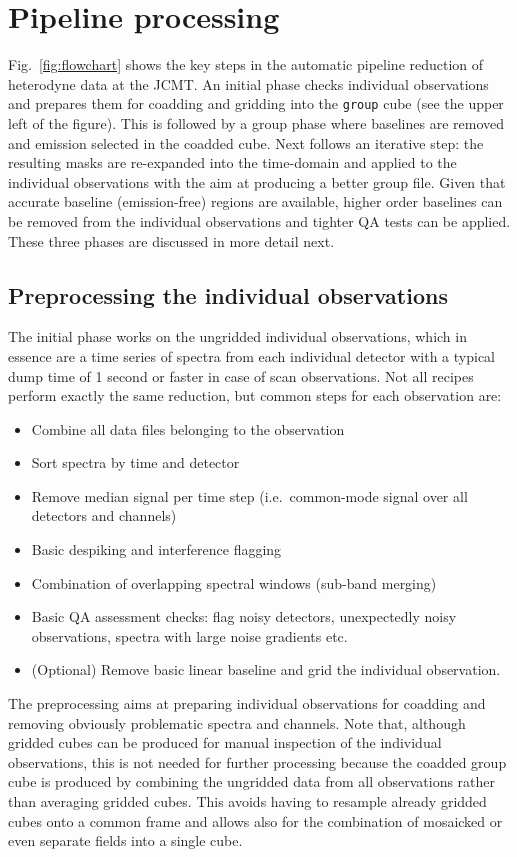 \documentclass[final,authoryear,5p,times,twocolumn]{elsarticle}
\begin{document}
\section{Pipeline processing}

Fig.~\ref{fig:flowchart} shows the key steps in the automatic
pipeline reduction of heterodyne data at the JCMT. An initial phase
checks individual observations and prepares them for coadding and
gridding into the \texttt{group} cube (see the upper left of the figure).
This is followed by a group
phase where baselines are removed and emission selected in the coadded
cube.  Next follows an iterative step: the resulting masks are
re-expanded into the time-domain and applied to the individual
observations with the aim at producing a better group file. Given that
accurate baseline (emission-free) regions are available, higher
order baselines can be removed from the individual observations and
tighter QA tests can be applied. These three phases are discussed in
more detail next.

\subsection{Preprocessing the individual observations}

The initial phase works on the ungridded individual observations,
which in essence are a time series of spectra from each individual
detector with a typical dump time of 1 second or faster in case of scan
observations.  Not all recipes perform exactly the same reduction, but
common steps for each observation are:
\begin{itemize}
\item Combine all data files belonging to the observation
\item Sort spectra by time and detector
\item Remove median signal per time step (i.e.\ common-mode signal over
all detectors and channels)
\item Basic despiking and interference flagging
\item Combination of overlapping spectral windows (sub-band merging)
\item Basic QA assessment checks: flag noisy detectors, unexpectedly noisy
observations, spectra with large noise gradients etc.
\item (Optional) Remove basic linear baseline and grid the individual
observation.
\end{itemize}

The preprocessing aims at preparing individual observations for
coadding and removing obviously problematic spectra and channels.
Note that, although gridded cubes can be produced for manual
inspection of the individual observations, this is not needed for
further processing because the coadded group cube is produced by
combining the ungridded data from all observations rather than
averaging gridded cubes.  This avoids having to resample already
gridded cubes onto a common frame and allows also for the combination
of mosaicked or even separate fields into a single cube.
\end{document}
